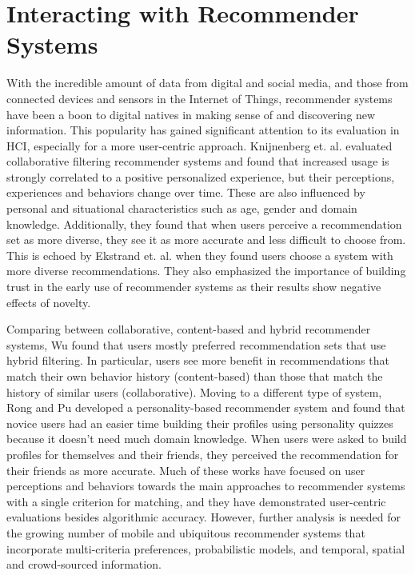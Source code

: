 \section{Interacting with Recommender Systems}

With the incredible amount of data from digital and social media, and those from connected devices and sensors in the Internet of Things, recommender systems have been a boon to digital natives in making sense of and discovering new information. This popularity has gained significant attention to its evaluation in HCI, especially for a more user-centric approach. Knijnenberg et. al. \cite{Knijnenburg2012ExplainingSystems} evaluated collaborative filtering recommender systems and found that increased usage is strongly correlated to a positive personalized experience, but their perceptions, experiences and behaviors change over time. These are also influenced by personal and situational characteristics such as age, gender and domain knowledge. Additionally, they found that when users perceive a recommendation set as more diverse, they see it as more accurate and less difficult to choose from. This is echoed by Ekstrand et. al. \cite{Ekstrand2014UserAlgorithms} when they found users choose a system with more diverse recommendations. They also emphasized the importance of building trust in the early use of recommender systems as their results show negative effects of novelty. 

Comparing between collaborative, content-based and hybrid recommender systems, Wu \cite{Wu2015HybridSystems} found that users mostly preferred recommendation sets that use hybrid filtering. In particular, users see more benefit in recommendations that match their own behavior history (content-based) than those that match the history of similar users (collaborative). Moving to a different type of system, Rong and Pu \cite{Hu2010ASystems} developed a personality-based recommender system and found that novice users had an easier time building their profiles using personality quizzes because it doesn't need much domain knowledge. When users were asked to build profiles for themselves and their friends, they perceived the recommendation for their friends as more accurate. Much of these works have focused on user perceptions and behaviors towards the main approaches to recommender systems with a single criterion for matching, and they have demonstrated user-centric evaluations besides algorithmic accuracy. However, further analysis is needed for the growing number of mobile and ubiquitous recommender systems that incorporate multi-criteria preferences, probabilistic models, and temporal, spatial and crowd-sourced information.

